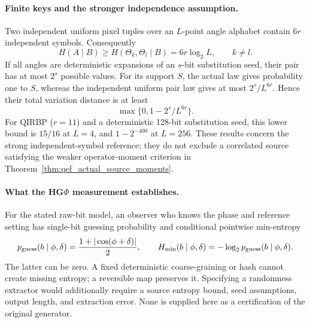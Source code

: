 {\paragraph{Finite keys and the stronger independence assumption.}
Two independent uniform pixel tuples over an $L$-point angle alphabet
contain $6r$ independent symbols. Consequently
\begin{equation}
 H(A\mid B)\geq H(\Theta_k,\Theta_l\mid B)=6r\log_2L,
 \qquad k\ne l.
 \label{eq:qef_source_entropy_requirement}
\end{equation}
If all angles are deterministic expansions of an $s$-bit substitution
seed, their pair has at most $2^s$ possible values. For its support $S$,
the actual law gives probability one to $S$, whereas the independent
uniform pair law gives at most $2^s/L^{6r}$. Hence their total variation
distance is at least
\begin{equation}
 \max\{0,1-2^s/L^{6r}\}.
 \label{eq:qef_source_support_obstruction}
\end{equation}
For QIRBP ($r=11$) and a deterministic 128-bit substitution seed, this
lower bound is $15/16$ at $L=4$, and $1-2^{-400}$ at $L=256$.
These results concern the strong independent-symbol reference; they do
not exclude a correlated source satisfying the weaker operator-moment
criterion in Theorem~\ref{thm:qef_actual_source_moments}.

\paragraph{What the HG$\Phi$ measurement establishes.}
For the stated raw-bit model, an observer who knows the phase and
reference setting has single-bit guessing probability and conditional
pointwise min-entropy
\begin{equation}
 p_{\rm guess}(b\mid\phi,\delta)
 =\frac{1+|\cos(\phi+\delta)|}{2},\qquad
 H_{\min}(b\mid\phi,\delta)
 =-\log_2p_{\rm guess}(b\mid\phi,\delta).
 \label{eq:qef_raw_bit_source_entropy}
\end{equation}
The latter can be zero. A fixed deterministic coarse-graining or hash
cannot create missing entropy; a reversible map preserves it. Specifying
a randomness extractor would additionally require a source entropy
bound, seed assumptions, output length, and extraction error. None is
supplied here as a certification of the original generator.

}
